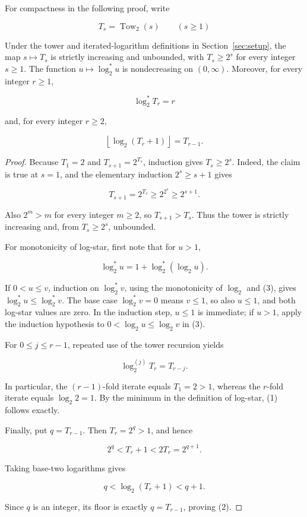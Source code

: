 For compactness in the following proof, write

\[
T_s=\operatorname{Tow}_2(s)\qquad(s\ge1)
\]

\begin{lemma}\label{lem:step-016-tower-arithmetic}
Under the tower and iterated-logarithm definitions in
Section~\ref{sec:setup}, the map
\(s\mapsto T_s\) is strictly increasing and unbounded, with
\(T_s\ge2^s\) for every integer \(s\ge1\). The function
\(u\mapsto\log_2^*u\) is nondecreasing on \((0,\infty)\). Moreover, for
every integer \(r\ge1\),

\[
\log_2^*T_r=r
\tag{1}
\]

and, for every integer \(r\ge2\),

\[
\left\lfloor\log_2(T_r+1)\right\rfloor=T_{r-1}.
\tag{2}
\]
\end{lemma}

\begin{proof}
Because \(T_1=2\) and \(T_{s+1}=2^{T_s}\), induction gives
\(T_s\ge2^s\). Indeed, the claim is true at \(s=1\), and the elementary
induction \(2^s\ge s+1\) gives

\[
T_{s+1}=2^{T_s}\ge2^{2^s}\ge2^{s+1}.
\]

Also \(2^m>m\) for every integer \(m\ge2\), so
\(T_{s+1}>T_s\). Thus the tower is strictly increasing and, from
\(T_s\ge2^s\), unbounded.

For monotonicity of log-star, first note that for \(u>1\),

\[
\log_2^*u=1+\log_2^*(\log_2u).
\tag{3}
\]

If \(0<u\le v\), induction on \(\log_2^*v\), using the monotonicity of
\(\log_2\) and (3), gives \(\log_2^*u\le\log_2^*v\). The base case
\(\log_2^*v=0\) means \(v\le1\), so also \(u\le1\), and both log-star
values are zero. In the induction step, \(u\le1\) is immediate; if
\(u>1\), apply the induction hypothesis to
\(0<\log_2u\le\log_2v\) in (3).

For \(0\le j\le r-1\), repeated use of the tower recursion yields

\[
\log_2^{(j)}T_r=T_{r-j}.
\tag{4}
\]

In particular, the \((r-1)\)-fold iterate equals \(T_1=2>1\), whereas
the \(r\)-fold iterate equals \(\log_2 2=1\). By the minimum in the
definition of log-star, (1) follows exactly.

Finally, put \(q=T_{r-1}\). Then \(T_r=2^q>1\), and hence

\[
2^q<T_r+1<2T_r=2^{q+1}.
\]

Taking base-two logarithms gives

\[
q<\log_2(T_r+1)<q+1.
\]

Since \(q\) is an integer, its floor is exactly \(q=T_{r-1}\), proving
(2). \end{proof}

